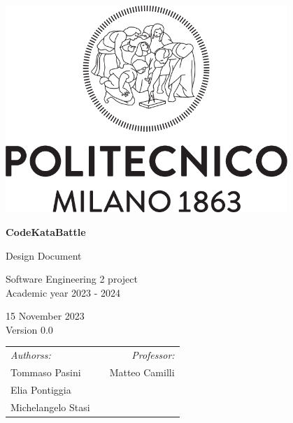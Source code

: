 
\begin{titlepage}
    \begin{center}
        \includegraphics[width=0.8\textwidth]{images/PoliMi_Logo.png}

        \vspace*{2cm}
        \textbf{\huge CodeKataBattle}

        \vspace{0.5cm}
        \LARGE Design Document

        \vspace{1.5cm}
        \normalsize Software Engineering 2 project\\
        Academic year 2023 - 2024

        \vspace{0.5cm}
        15 November 2023\\
        Version 0.0

        \vspace{1cm}
        \small
        \begin{table}[b]
            \centering
            \begin{tabular}{l p{5.5cm} l}
                \textit{Authorss:}   &  & \multicolumn{1}{r}{\textit{Professor:}} \\
                Tommaso Pasini     &  & \multicolumn{1}{r}{Matteo Camilli}      \\
                Elia Pontiggia     &  & \textbf{}                               \\
                Michelangelo Stasi &  & \textbf{}
            \end{tabular}
        \end{table}

    \end{center}
\end{titlepage}